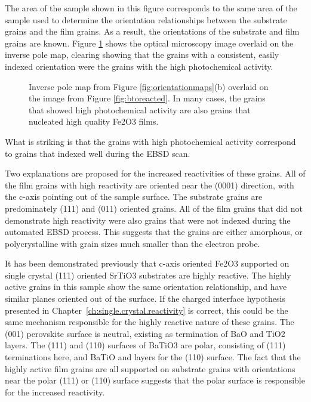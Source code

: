 \documentclass[12pt,%
              twoside,
               letterpaper]{uiothesis}
\begin{document}
The area of the sample shown in this figure corresponds to the same area of the sample used to determine the orientation relationships between the substrate grains and the film grains. As a result, the orientations of the substrate and film grains are known. Figure \ref{fig:btooverlay} shows the optical microscopy image overlaid on the inverse pole map, clearing showing that the grains with a consistent, easily indexed orientation were the grains with the high photochemical activity.
\begin{figure}[htbp]
\begin{center}
\caption[Inverse pole map overlaid on the image from Figure \ref{fig:btoreacted}]{Inverse pole map from Figure \ref{fig:orientationmaps}(b) overlaid on the image from Figure \ref{fig:btoreacted}. In many cases, the grains that showed high photochemical activity are also grains that nucleated high quality Fe2O3 films.}
\label{fig:btooverlay} %
\end{center}
\end{figure}
What is striking is that the grains with high photochemical activity correspond to grains that indexed well during the EBSD scan. 

Two explanations are proposed for the increased reactivities of these grains. All of the film grains with high reactivity are oriented near the (0001) direction, with the c-axis pointing out of the sample surface. The substrate grains are predominately (111) and (011) oriented grains. All of the film grains that did not demonstrate high reactivity were also grains that were not indexed during the automated EBSD process. This suggests that the grains are either amorphous, or polycrystalline with grain sizes much smaller than the electron probe. 

It has been demonstrated previously that c-axis oriented Fe2O3 supported on single crystal (111) oriented SrTiO3 substrates are highly reactive. The highly active grains in this sample show the same orientation relationship, and have similar planes oriented out of the surface. If the charged interface hypothesis presented in Chapter~\ref{ch:single.crystal.reactivity} is correct, this could be the same mechanism responsible for the highly reactive nature of these grains. The (001) perovskite surface is neutral, existing as termination of BaO and TiO2 layers. The (111) and (110) surfaces of BaTiO3 are polar, consisting of (111) terminations here, and BaTiO and  layers for the (110) surface. The fact that the highly active film grains are all supported on substrate grains with orientations near the polar (111) or (110) surface suggests that the polar surface is responsible for the increased reactivity.
\end{document}

